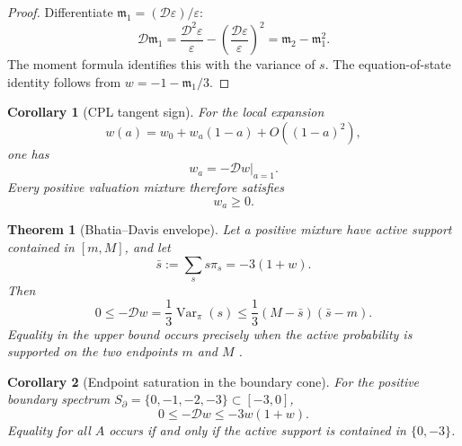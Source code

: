 \documentclass[aps,prd,reprint,onecolumn,nofootinbib,superscriptaddress,showkeys]{revtex4-2}
\numberwithin{equation}{section}
\theoremstyle{definition}
\theoremstyle{plain}
\newtheorem{theorem}{Theorem}[section]
\newtheorem{corollary}{Corollary}[section]
\newcommand{\Dil}{\mathscr D}
\begin{document}
\begin{proof}
Differentiate \(\mathfrak m_1=(\Dil\varepsilon)/\varepsilon\):
\[
\Dil\mathfrak m_1
=
\frac{\Dil^2\varepsilon}{\varepsilon}
-
\left(\frac{\Dil\varepsilon}{\varepsilon}\right)^2
=
\mathfrak m_2-\mathfrak m_1^2.
\]
The moment formula identifies this with the variance of \(s\).  The equation-of-state identity follows from \(w=-1-\mathfrak m_1/3\).
\end{proof}

\begin{corollary}[CPL tangent sign]
For the local expansion
\[
w(a)=w_0+w_a(1-a)+O((1-a)^2),
\]
one has
\[
w_a=-\Dil w|_{a=1}.
\]
Every positive valuation mixture therefore satisfies
\begin{equation}
w_a\ge0.
\end{equation}
\end{corollary}

\begin{theorem}[Bhatia--Davis envelope]
Let a positive mixture have active support contained in \([m,M]\), and let
\begin{equation}
\bar s:=\sum_s s\pi_s=-3(1+w).
\end{equation}
Then
\begin{equation}
0\le-\Dil w
=
\frac13\operatorname{Var}_\pi(s)
\le
\frac13(M-\bar s)(\bar s-m).
\end{equation}
Equality in the upper bound occurs precisely when the active probability is supported on the two endpoints \(m\) and \(M\) \cite{BhatiaDavis2000}.
\end{theorem}

\begin{corollary}[Endpoint saturation in the boundary cone]
For the positive boundary spectrum \(S_\partial=\{0,-1,-2,-3\}\subset[-3,0]\),
\begin{equation}
0\le-\Dil w\le -3w(1+w).
\end{equation}
Equality for all \(A\) occurs if and only if the active support is contained in \(\{0,-3\}\).
\end{corollary}
\end{document}
